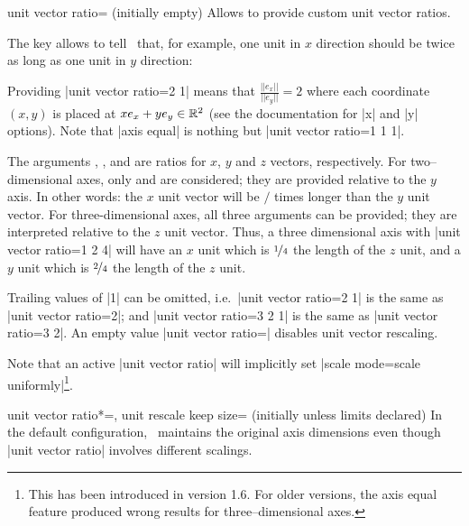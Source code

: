 \begin{pgfplotskey}{unit vector ratio= (initially empty)}
	Allows to provide custom unit vector ratios. 

	The key allows to tell \PGFPlots\ that, for example, one unit in $x$ direction should be twice as long as one unit in $y$ direction:
\begin{codeexample}[]
\end{codeexample}
	\noindent Providing |unit vector ratio=2 1| means that $\frac{||e_x||}{||e_y||} = 2$ where each coordinate $(x,y)$ is placed at $x e_x + y e_y \in \mathbb{R}^2$ (see the documentation for |x| and |y| options). Note that |axis equal| is nothing but |unit vector ratio=1 1 1|.

	The arguments , , and  are ratios for $x$, $y$ and $z$ vectors, respectively. For two--dimensional axes, only  and  are considered; they are provided relative to the $y$ axis. In other words: the $x$ unit vector will be  $/$  times longer than the $y$ unit vector. For three-dimensional axes, all three arguments can be provided; they are interpreted relative to the $z$ unit vector. Thus, a three dimensional axis with |unit vector ratio=1 2 4| will have an $x$ unit which is $\nicefrac 14$ the length of the $z$ unit, and a $y$ unit which is $\nicefrac24$ the length of the $z$ unit. 
	
	Trailing values of |1| can be omitted, i.e.\ |unit vector ratio=2 1| is the same as |unit vector ratio=2|; and |unit vector ratio=3 2 1| is the same as |unit vector ratio=3 2|.
	An empty value |unit vector ratio={}| disables unit vector rescaling.

	Note that an active |unit vector ratio| will implicitly set |scale mode=scale uniformly|\footnote{This has been introduced in version 1.6. For older versions, the axis equal feature produced wrong results for three--dimensional axes.}.

	\begin{pgfplotskeylist}{%
		unit vector ratio*=,
		unit rescale keep size= (initially unless limits declared)}
	In the default configuration, \PGFPlots\ maintains the original axis dimensions even though |unit vector ratio| involves different scalings. 
	\label{key:unit:rescale:keep:size}


\end{pgfplotskeylist}
\end{pgfplotskey}
